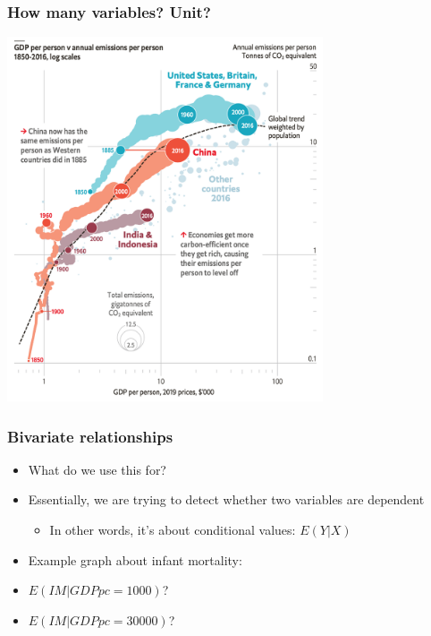 \documentclass[aspectratio=43]{beamer}
\begin{document}
\begin{frame}
\frametitle{How many variables? Unit?}
\centering

\includegraphics[width = 0.7\textwidth]{../img/emissions}

\end{frame}

\begin{frame}
\frametitle{Bivariate relationships}
\centering

\begin{itemize}[<+->]
  \item<1-> What do we use this for?
  \item<2-> Essentially, we are trying to detect whether two variables are dependent
  \begin{itemize}
    \item In other words, it's about conditional values: $E(Y|X)$
  \end{itemize}
  \item<3-> Example graph about infant mortality:
  \item<3->[] $E(IM|GDPpc = 1000)$?
  \item<3->[] $E(IM|GDPpc = 30000)$?
\end{itemize}

\end{frame}
\end{document}
